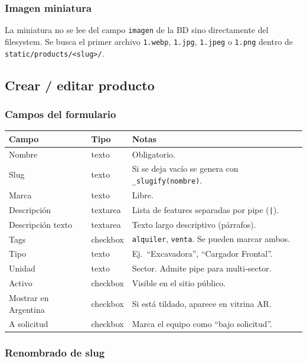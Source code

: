 \documentclass[11pt,a4paper]{article}
\begin{document}
\subsubsection{Imagen miniatura}
La miniatura no se lee del campo \texttt{imagen} de la BD sino directamente
del filesystem. Se busca el primer archivo \texttt{1.webp},
\texttt{1.jpg}, \texttt{1.jpeg} o \texttt{1.png} dentro de
\texttt{static/products/<slug>/}.

\subsection{Crear / editar producto}

\subsubsection{Campos del formulario}

\begin{longtable}{p{3.5cm} p{1.5cm} p{8cm}}
\toprule
\textbf{Campo} & \textbf{Tipo} & \textbf{Notas} \\
\midrule
\endhead
Nombre              & texto    & Obligatorio. \\
Slug                & texto    & Si se deja vacío se genera con \texttt{\_slugify(nombre)}. \\
Marca               & texto    & Libre. \\
Descripción         & textarea & Lista de features separadas por pipe (\texttt{|}). \\
Descripción texto   & textarea & Texto largo descriptivo (párrafos). \\
Tags                & checkbox & \texttt{alquiler}, \texttt{venta}. Se pueden marcar ambos. \\
Tipo                & texto    & Ej.\ ``Excavadora'', ``Cargador Frontal''. \\
Unidad              & texto    & Sector. Admite pipe para multi-sector. \\
Activo              & checkbox & Visible en el sitio público. \\
Mostrar en Argentina & checkbox & Si está tildado, aparece en vitrina AR. \\
A solicitud         & checkbox & Marca el equipo como ``bajo solicitud''. \\
\bottomrule
\end{longtable}

\subsubsection{Renombrado de slug}
\end{document}
